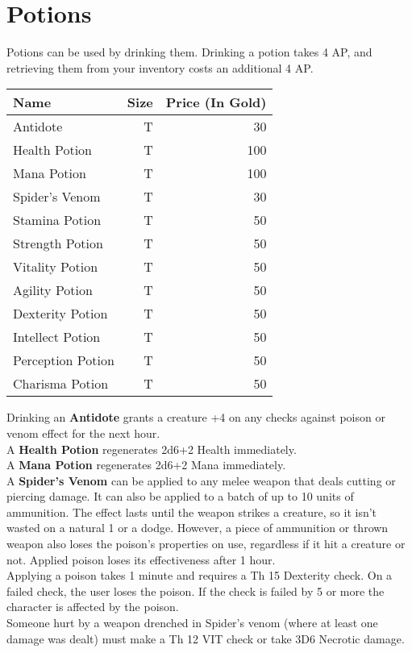 \section{Potions}\label{sec:potions}
Potions can be used by drinking them.
Drinking a potion takes 4 AP, and retrieving them from your inventory costs an additional 4 AP.

\begin{longtable}{l | r | r}
	Name & Size & Price (In Gold)\\ \hline
	Antidote & T & 30\\
	Health Potion & T & 100\\
	Mana Potion & T & 100\\
	Spider's Venom & T & 30\\
	Stamina Potion & T & 50\\
	Strength Potion & T & 50\\
	Vitality Potion & T & 50\\
	Agility Potion & T & 50\\
	Dexterity Potion & T & 50\\
	Intellect Potion & T & 50\\
	Perception Potion & T & 50\\
	Charisma Potion & T & 50\\
\end{longtable}


Drinking an \textbf{Antidote} grants a creature +4 on any checks against poison or venom effect for the next hour.\\

A \textbf{Health Potion} regenerates 2d6+2 Health immediately.\\

A \textbf{Mana Potion} regenerates 2d6+2 Mana immediately.\\

A \textbf{Spider's Venom} can be applied to any melee weapon that deals cutting or piercing damage.
It can also be applied to a batch of up to 10 units of ammunition.
The effect lasts until the weapon strikes a creature, so it isn't wasted on a natural 1 or a dodge.
However, a piece of ammunition or thrown weapon also loses the poison's properties on use, regardless if it hit a creature or not.
Applied poison loses its effectiveness after 1 hour.\\
Applying a poison takes 1 minute and requires a Th 15 Dexterity check.
On a failed check, the user loses the poison.
If the check is failed by 5 or more the character is affected by the poison.\\
Someone hurt by a weapon drenched in Spider's venom (where at least one damage was dealt) must make a Th 12 VIT check or take 3D6 Necrotic damage.\\

